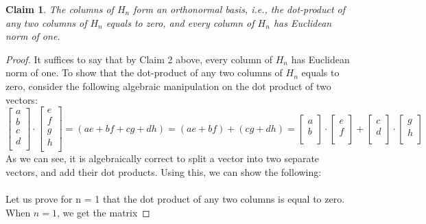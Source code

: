 \documentclass[11pt]{article}
\newtheorem{claim}[theorem]{Claim}
\begin{document}
	\begin{claim} 
		The columns of $H_n$ form an orthonormal basis, i.e., the dot-product of any two columns of $H_n$ equals to zero, and every column of $H_n$ has Euclidean norm of one. 
	\end{claim}

	\begin{proof}
		 It suffices to say that by Claim 2 above, every column of $H_n$ has Euclidean norm of one.
		 To show that the dot-product of any two columns of $H_n$ equals to zero, consider the following algebraic manipulation on the dot product of two vectors:\\
		 $
		 \begin{bmatrix}
				 a \\
				 b \\
				 c \\
				 d \\
		 \end{bmatrix} \cdot \begin{bmatrix}
				 e \\
				 f \\
				 g \\
				 h \\
		 \end{bmatrix} = (ae + bf + cg + dh) = (ae + bf) + (cg + dh) = \begin{bmatrix}
				 a \\
				 b \\
		 \end{bmatrix} \cdot \begin{bmatrix}
				 e \\
				 f \\
		 \end{bmatrix} + \begin{bmatrix}
				c \\
				d \\
		\end{bmatrix} \cdot \begin{bmatrix}
				g \\
				h \\
		\end{bmatrix} 
		$\\
		As we can see, it is algebraically correct to split a vector into two separate vectors, and add their dot products. Using this, we can show the following:\\
		\\ 
		Let us prove for n = 1 that the dot product of any two columns is equal to zero. 
		When $n=1$, we get the matrix 

\end{proof}
\end{document}
